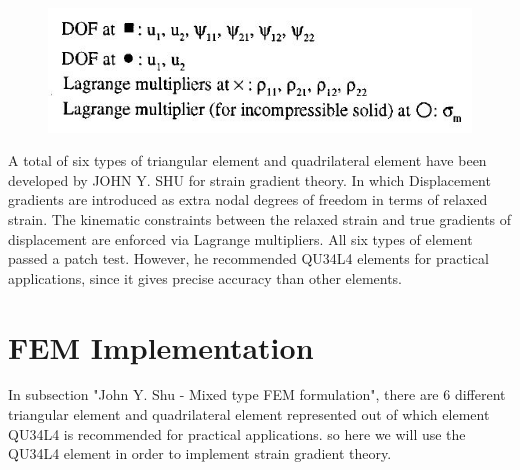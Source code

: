 \documentclass[12pt]{article}
\begin{document}
\begin{figure}[H]
	\begin{center}
		\includegraphics[scale=0.8]{Shu_info.JPG}
	\end{center}  
\end{figure}
A total of six types of triangular element and quadrilateral element have been developed by JOHN Y. SHU for strain gradient theory. In which Displacement gradients are introduced as extra nodal degrees of freedom in terms of relaxed strain. The kinematic constraints between the relaxed strain and true gradients of displacement are enforced via Lagrange multipliers. All six types of element passed a patch test. However, he recommended QU34L4 elements for practical applications, since it gives precise accuracy than other elements.
\newpage

\section{FEM Implementation}
In subsection "John Y. Shu - Mixed type FEM formulation", there are 6 different triangular element and quadrilateral element represented out of which element QU34L4 is recommended for practical applications. so here we will use the QU34L4 element in order to implement strain gradient theory.
\\
\end{document}
